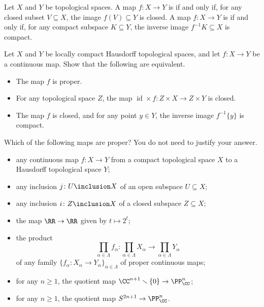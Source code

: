 \documentclass[a4paper,twoside,nols,nobib]{tufte-handout}
\begin{document}

\begin{dfn*}
	Let $X$ and $Y$ be topological spaces.
	A map $f \colon X \to Y$ is  if and only if, for any closed subset $V \subseteq X$, the image $f(V) \subseteq Y$ is closed.
	A map $f \colon X \to Y$ is  if and only if, for any compact subspace $K \subseteq Y$, the inverse image $f^{-1}K \subseteq X$ is compact.
\end{dfn*}


\begin{Problem}
	\noindent
	Let $X$ and $Y$ be locally compact Hausdorff topological spaces, and let $f \colon X \to Y$ be a continuous map.
	Show that the following are equivalent.
	\begin{itemize}
		\item The map $f$ is proper.
		\item For any topological space $Z$, the map $\operatorname{id} \times f \colon Z \times X \to Z \times Y$ is closed.
		\item The map $f$ is closed, and for any point $y \in Y$, the inverse image $f^{-1}\{y\}$ is compact.
	\end{itemize}
\end{Problem}


\begin{Problem}
	\noindent
	Which of the following maps are proper? You do not need to justify your answer.
	\begin{itemize}
		\item any continuous map $f \colon X \to Y$ from a compact topological space $X$ to a Hausdorff topological space $Y$;
		\item any inclusion $j \colon U \inclusion X$ of an open subspace $U \subseteq X$;
		\item any inclusion $i \colon Z \inclusion X$ of a closed subspace $Z \subseteq X$;
		\item the map $\RR \to \RR$ given by $t \mapsto 2^t$;
		\item the product
		\[
			\prod_{\alpha\in\Lambda} f_{\alpha} \colon \prod_{\alpha\in\Lambda} X_{\alpha} \to \prod_{\alpha\in\Lambda} Y_{\alpha}
		\]
		of any family $\{f_{\alpha} \colon X_{\alpha} \to Y_{\alpha}\}_{\alpha \in \Lambda}$ of proper continuous maps;
		\item for any $n \geq 1$, the quotient map $\CC^{n+1}\smallsetminus \{0\} \to \PP_{\CC}^n$;
		\item for any $n \geq 1$, the quotient map $S^{2n+1} \to \PP_{\CC}^n$.
	\end{itemize}
\end{Problem}
\end{document}
